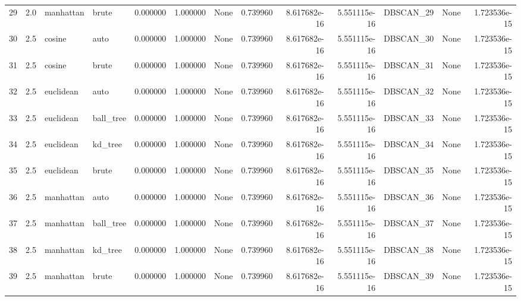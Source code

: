 \begin{tabular}{lrllrrlrrrllr}
29 &  2.0 &  manhattan &      brute &             0.000000 &            1.000000 &                 None &               0.739960 &       8.617682e-16 &       5.551115e-16 &  DBSCAN\_29 &             None &     1.723536e-15 \\
30 &  2.5 &     cosine &       auto &             0.000000 &            1.000000 &                 None &               0.739960 &       8.617682e-16 &       5.551115e-16 &  DBSCAN\_30 &             None &     1.723536e-15 \\
31 &  2.5 &     cosine &      brute &             0.000000 &            1.000000 &                 None &               0.739960 &       8.617682e-16 &       5.551115e-16 &  DBSCAN\_31 &             None &     1.723536e-15 \\
32 &  2.5 &  euclidean &       auto &             0.000000 &            1.000000 &                 None &               0.739960 &       8.617682e-16 &       5.551115e-16 &  DBSCAN\_32 &             None &     1.723536e-15 \\
33 &  2.5 &  euclidean &  ball\_tree &             0.000000 &            1.000000 &                 None &               0.739960 &       8.617682e-16 &       5.551115e-16 &  DBSCAN\_33 &             None &     1.723536e-15 \\
34 &  2.5 &  euclidean &    kd\_tree &             0.000000 &            1.000000 &                 None &               0.739960 &       8.617682e-16 &       5.551115e-16 &  DBSCAN\_34 &             None &     1.723536e-15 \\
35 &  2.5 &  euclidean &      brute &             0.000000 &            1.000000 &                 None &               0.739960 &       8.617682e-16 &       5.551115e-16 &  DBSCAN\_35 &             None &     1.723536e-15 \\
36 &  2.5 &  manhattan &       auto &             0.000000 &            1.000000 &                 None &               0.739960 &       8.617682e-16 &       5.551115e-16 &  DBSCAN\_36 &             None &     1.723536e-15 \\
37 &  2.5 &  manhattan &  ball\_tree &             0.000000 &            1.000000 &                 None &               0.739960 &       8.617682e-16 &       5.551115e-16 &  DBSCAN\_37 &             None &     1.723536e-15 \\
38 &  2.5 &  manhattan &    kd\_tree &             0.000000 &            1.000000 &                 None &               0.739960 &       8.617682e-16 &       5.551115e-16 &  DBSCAN\_38 &             None &     1.723536e-15 \\
39 &  2.5 &  manhattan &      brute &             0.000000 &            1.000000 &                 None &               0.739960 &       8.617682e-16 &       5.551115e-16 &  DBSCAN\_39 &             None &     1.723536e-15 \\
\bottomrule
\end{tabular}
